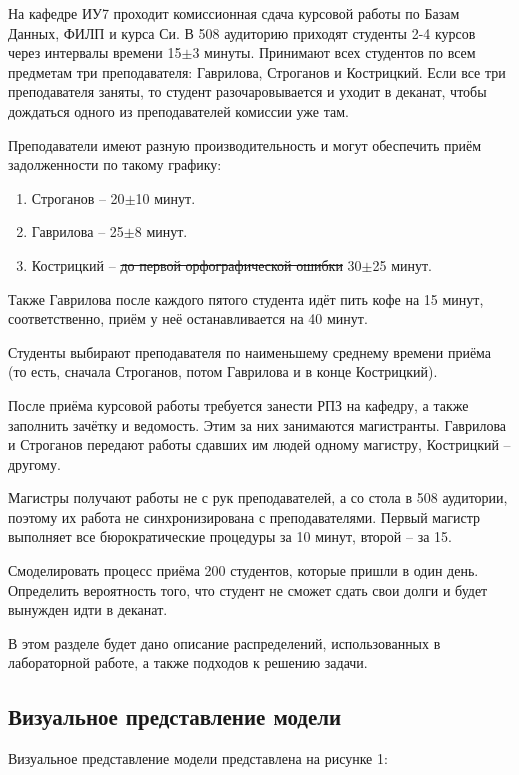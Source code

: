 На кафедре ИУ7 проходит комиссионная сдача курсовой работы по Базам Данных, ФИЛП и курса Си. 
В 508 аудиторию приходят студенты 2-4 курсов через интервалы времени 15$\pm$3 минуты. 
Принимают всех студентов по всем предметам три преподавателя: Гаврилова, Строганов и Кострицкий.
Если все три преподавателя заняты, то студент разочаровывается и уходит в деканат, чтобы дождаться одного из преподавателей комиссии уже там.

Преподаватели имеют разную производительность и могут обеспечить приём задолженности по такому графику:
\begin{enumerate}
	\item Строганов -- 20$\pm$10 минут.
	\item Гаврилова -- 25$\pm$8 минут.
	\item Кострицкий -- \sout{до первой орфографической ошибки} 30$\pm$25 минут.
\end{enumerate}

Также Гаврилова после каждого пятого студента идёт пить кофе на 15 минут, соответственно, приём у неё останавливается на 40 минут.

Студенты выбирают преподавателя по наименьшему среднему времени приёма (то есть, сначала Строганов, потом Гаврилова и в конце Кострицкий).

После приёма курсовой работы требуется занести РПЗ на кафедру, а также заполнить зачётку и ведомость.
Этим за них занимаются магистранты. 
Гаврилова и Строганов передают работы сдавших им людей одному магистру, Кострицкий -- другому.

Магистры получают работы не с рук преподавателей, а со стола в 508 аудитории, поэтому их работа не синхронизирована с преподавателями.
Первый магистр выполняет все бюрократические процедуры за 10 минут, второй -- за 15.

Смоделировать процесс приёма 200 студентов, которые пришли в один день. 
Определить вероятность того, что студент не сможет сдать свои долги и будет вынужден идти в деканат.
\newpage

В этом разделе будет дано описание распределений, использованных в лабораторной работе, а также подходов к решению задачи.


\subsection*{Визуальное представление модели}
Визуальное представление модели представлена на рисунке 1:

